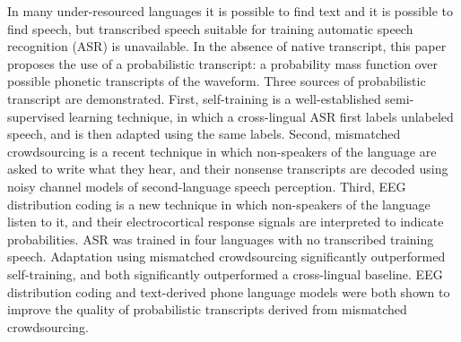 In many under-resourced languages it is possible to find text and it is possible to find speech, but transcribed speech suitable for training automatic speech recognition (ASR) is unavailable.  In the absence of native transcript, this paper proposes the use of a probabilistic transcript: a probability mass function over possible phonetic transcripts of the waveform.  Three sources of probabilistic transcript are demonstrated.  First, self-training is a well-established semi-supervised learning technique, in which a cross-lingual ASR first labels unlabeled speech, and is then adapted using the same labels.  Second, mismatched crowdsourcing is a recent technique in which non-speakers of the language are asked to write what they hear, and their nonsense transcripts are decoded using noisy channel models of second-language speech perception.  Third, EEG distribution coding is a new technique in which non-speakers of the language listen to it, and their electrocortical response signals are interpreted to indicate probabilities.  ASR was trained in four languages with no transcribed training speech.  Adaptation using mismatched crowdsourcing significantly outperformed self-training, and both significantly outperformed a cross-lingual baseline.  EEG distribution coding and text-derived phone language models were both shown to improve the quality of probabilistic transcripts derived from mismatched crowdsourcing.
